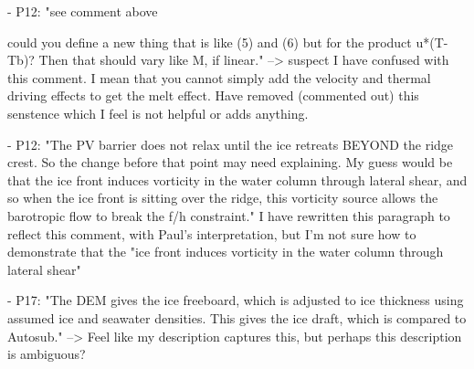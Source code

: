 - P12: "see comment above

could you define a new thing that is like (5) and (6) but for the product u*(T-Tb)?  Then that should vary like M, if linear." --> suspect I have confused with this comment. I mean that you cannot simply add the velocity and thermal driving effects to get the melt effect. Have removed (commented out) this senstence which I feel is not helpful or adds anything.

- P12: "The PV barrier does not relax until the ice retreats BEYOND the ridge crest. So the change before that point may need explaining.  My guess would be that the ice front induces vorticity in the water column through lateral shear, and so when the ice front is sitting over the ridge, this vorticity source allows the barotropic flow to break the f/h constraint."
I have rewritten this paragraph to reflect this comment, with Paul's interpretation, but I'm not sure how to demonstrate that the "ice front induces vorticity in the water column through lateral shear"

- P17: "The DEM gives the ice freeboard, which is adjusted to ice thickness using assumed ice and seawater densities.  This gives the ice draft, which is compared to Autosub." 
--> Feel like my description captures this, but perhaps this description is ambiguous?

